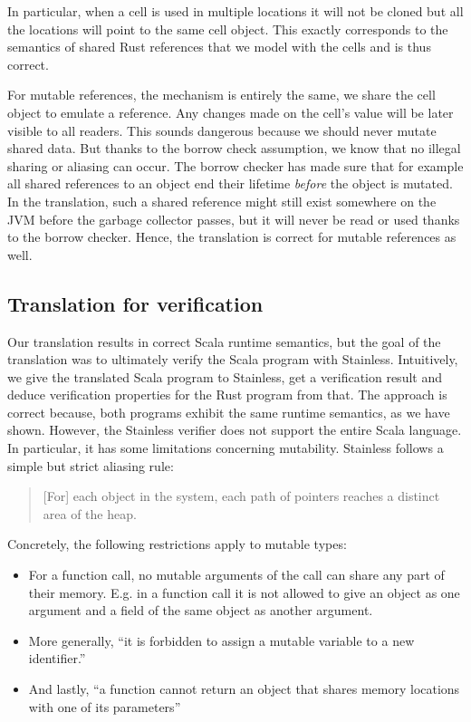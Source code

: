In particular, when a cell is used in multiple locations it will not be
cloned but all the locations will point to the same cell object. This
exactly corresponds to the semantics of shared Rust references that we
model with the cells and is thus correct.

For mutable references, the mechanism is entirely the same, we share the
cell object to emulate a reference. Any changes made on the cell's value
will be later visible to all readers. This sounds dangerous because we
should never mutate shared data. But thanks to the borrow check
assumption, we know that no illegal sharing or aliasing can occur. The
borrow checker has made sure that for example all shared references to
an object end their lifetime \emph{before} the object is mutated. In the
translation, such a shared reference might still exist somewhere on the
JVM before the garbage collector passes, but it will never be read or
used thanks to the borrow checker. Hence, the translation is correct for
mutable references as well.

\subsection{Translation for verification}

Our translation results in correct Scala runtime semantics, but the goal
of the translation was to ultimately verify the Scala program with
Stainless. Intuitively, we give the translated Scala program to
Stainless, get a verification result and deduce verification properties
for the Rust program from that. The approach is correct because, both
programs exhibit the same runtime semantics, as we have shown. However,
the Stainless verifier does not support the entire Scala language. In
particular, it has some limitations concerning mutability. Stainless
follows a simple but strict aliasing rule:

\begin{quote}
{[}For{]} each object in the system, each path of pointers reaches a
distinct area of the heap. \cite[p.~59]{regb}
\end{quote}

Concretely, the following restrictions apply to mutable types:

\begin{itemize}
\tightlist
\item
  For a function call, no mutable arguments of the call can share any
  part of their memory. E.g. in a function call it is not allowed to
  give an object as one argument and a field of the same object as
  another argument.
\item
  More generally, ``it is forbidden to assign a mutable variable to a
  new identifier.'' \cite[p.~59]{regb}
\item
  And lastly, ``a function cannot return an object that shares memory
  locations with one of its parameters'' \cite[p.~59]{regb}
\end{itemize}

